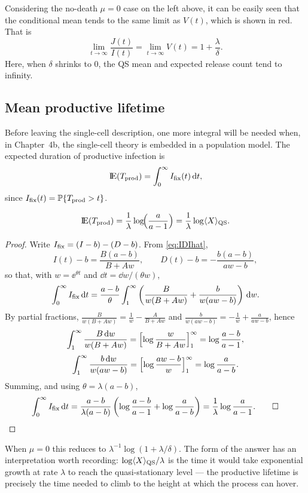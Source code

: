 Considering the no-death $\mu = 0$ case on the left above, it can be easily
seen that the conditional mean tends to the same limit as $V(t)$, which is
shown in red. That is
$$\lim_{t\to\infty}     \frac{J(t)}{I(t)}     =    \lim_{t\to\infty} V(t)  = 1 + \frac{\lambda}{\delta}.$$
Here, when $\delta$ shrinks to $0$, the QS mean and expected release count
tend to infinity.

\subsection{Mean productive lifetime}
\label{sec:lifetime}

Before leaving the single-cell description, one more integral will be needed
when, in Chapter~4b, the single-cell theory is embedded in a population
model. The expected duration of productive infection is
\begin{equation}
{\rm I}\!{\rm E}(T_{\rm prod})=\int_0^\infty I_{\mathrm{fix}}(t)\,{\rm d} t,
\end{equation}
since $I_{\mathrm{fix}}(t)=\mathbb{P}\!\left\{T_{\rm prod}>t\right\}$.

\begin{proposition}
\label{prop:lifetime}
\begin{equation}
{\rm I}\!{\rm E}(T_{\rm prod})
=\frac{1}{\lambda}\log\!\Bigl(\frac{a}{a-1}\Bigr)
=\frac{1}{\lambda}\log\langle X\rangle_{\rm QS}.
\end{equation}
\end{proposition}

\begin{proof}
Write $I_{\mathrm{fix}}=(I-b)-(D-b)$. From \eqref{eq:IDIhat},
$$
I(t)-b=\frac{B(a-b)}{B+Aw},
\qquad
D(t)-b=-\frac{b(a-b)}{aw-b},
$$
so that, with $w=\ee^{\theta t}$ and $\dd t=\dd w/(\theta w)$,
$$
\int_0^\infty I_{\mathrm{fix}}\,{\rm d} t
=\frac{a-b}{\theta}\int_1^\infty
\left(\frac{B}{w(B+Aw)}+\frac{b}{w(aw-b)}\right)\,{\rm d} w.
$$
By partial fractions,
$\frac{B}{w(B+Aw)}=\frac{1}{w}-\frac{A}{B+Aw}$ and
$\frac{b}{w(aw-b)}=-\frac{1}{w}+\frac{a}{aw-b}$, hence
$$
\int_1^\infty\frac{B\,{\rm d} w}{w(B+Aw)}
=\Bigl[\log\frac{w}{B+Aw}\Bigr]_1^\infty
=\log\frac{a-b}{a-1},
$$
$$
\int_1^\infty\frac{b\,{\rm d} w}{w(aw-b)}
=\Bigl[\log\frac{aw-b}{w}\Bigr]_1^\infty
=\log\frac{a}{a-b}.
$$
Summing, and using $\theta=\lambda(a-b)$,
$$
\int_0^\infty I_{\mathrm{fix}}\,{\rm d} t
=\frac{a-b}{\lambda(a-b)}
\left(\log\frac{a-b}{a-1}+\log\frac{a}{a-b}\right)
=\frac{1}{\lambda}\log\frac{a}{a-1}.\qquad\square
$$
\end{proof}

When $\mu=0$ this reduces to $\lambda^{-1}\log(1+\lambda/\delta)$. The form of
the answer has an interpretation worth recording:
$\log\langle X\rangle_{\rm QS}/\lambda$ is the time it would take exponential
growth at rate $\lambda$ to reach the quasi-stationary level --- the productive
lifetime is precisely the time needed to climb to the height at which the
process can hover.
